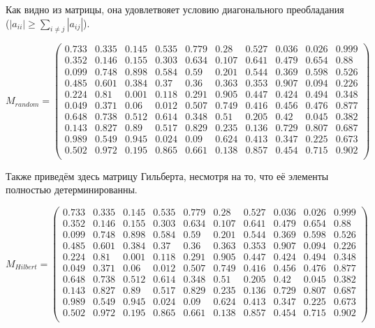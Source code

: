 \documentclass[../../report.tex]{subfiles}
\begin{document}
Как видно из матрицы, она удовлетвояет условию диагонального преобладания \\
($|a_{ii}| \geq \sum_{i \neq j} |a_{ij}| $).

\[
    M_{random} = 
    \begin{pmatrix}
        0.733 & 0.335 & 0.145 & 0.535 & 0.779 & 0.28  & 0.527 & 0.036 & 0.026 & 0.999 \\
        0.352 & 0.146 & 0.155 & 0.303 & 0.634 & 0.107 & 0.641 & 0.479 & 0.654 & 0.88  \\
        0.099 & 0.748 & 0.898 & 0.584 & 0.59  & 0.201 & 0.544 & 0.369 & 0.598 & 0.526 \\
        0.485 & 0.601 & 0.384 & 0.37  & 0.36  & 0.363 & 0.353 & 0.907 & 0.094 & 0.226 \\
        0.224 & 0.81  & 0.001 & 0.118 & 0.291 & 0.905 & 0.447 & 0.424 & 0.494 & 0.348 \\
        0.049 & 0.371 & 0.06  & 0.012 & 0.507 & 0.749 & 0.416 & 0.456 & 0.476 & 0.877 \\
        0.648 & 0.738 & 0.512 & 0.614 & 0.348 & 0.51  & 0.205 & 0.42  & 0.045 & 0.382 \\
        0.143 & 0.827 & 0.89  & 0.517 & 0.829 & 0.235 & 0.136 & 0.729 & 0.807 & 0.687 \\
        0.989 & 0.549 & 0.945 & 0.024 & 0.09  & 0.624 & 0.413 & 0.347 & 0.225 & 0.673 \\
        0.502 & 0.972 & 0.195 & 0.865 & 0.661 & 0.138 & 0.857 & 0.454 & 0.715 & 0.902 \\

    \end{pmatrix}
\]

Также приведём здесь матрицу Гильберта, несмотря на то, что её элементы полностью детерминированны.

\[
    M_{Hilbert} =
    \begin{pmatrix}
        0.733 & 0.335 & 0.145 & 0.535 & 0.779 & 0.28  & 0.527 & 0.036 & 0.026 & 0.999 \\
        0.352 & 0.146 & 0.155 & 0.303 & 0.634 & 0.107 & 0.641 & 0.479 & 0.654 & 0.88  \\
        0.099 & 0.748 & 0.898 & 0.584 & 0.59  & 0.201 & 0.544 & 0.369 & 0.598 & 0.526 \\
        0.485 & 0.601 & 0.384 & 0.37  & 0.36  & 0.363 & 0.353 & 0.907 & 0.094 & 0.226 \\
        0.224 & 0.81  & 0.001 & 0.118 & 0.291 & 0.905 & 0.447 & 0.424 & 0.494 & 0.348 \\ 
        0.049 & 0.371 & 0.06  & 0.012 & 0.507 & 0.749 & 0.416 & 0.456 & 0.476 & 0.877 \\
        0.648 & 0.738 & 0.512 & 0.614 & 0.348 & 0.51  & 0.205 & 0.42  & 0.045 & 0.382 \\
        0.143 & 0.827 & 0.89  & 0.517 & 0.829 & 0.235 & 0.136 & 0.729 & 0.807 & 0.687 \\
        0.989 & 0.549 & 0.945 & 0.024 & 0.09  & 0.624 & 0.413 & 0.347 & 0.225 & 0.673 \\
        0.502 & 0.972 & 0.195 & 0.865 & 0.661 & 0.138 & 0.857 & 0.454 & 0.715 & 0.902 \\

    \end{pmatrix}
\]
\end{document}
